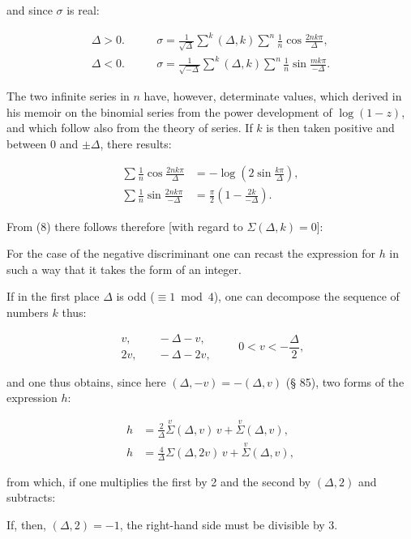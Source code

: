 and since $\sigma$ is real:

\[
\begin{aligned}
\Delta>0. &\qquad \sigma = \frac{1}{\sqrt{\Delta}}\overset{k}{\sum}(\Delta,k)\overset{n}{\sum}\frac{1}{n}\cos\frac{2nk\pi}{\Delta},\\
\Delta<0. &\qquad \sigma = \frac{1}{\sqrt{-\Delta}}\overset{k}{\sum}(\Delta,k)\overset{n}{\sum}\frac{1}{n}\sin\frac{mk\pi}{-\Delta}. %
\end{aligned}
\]

The two infinite series in $n$ have, however, determinate
values, which  derived in his memoir on the binomial series
from the power development of $\log(1-z)$, and which follow
also from the theory of  series. If $k$ is
then taken positive and between $0$ and $\pm\Delta$, there results:

\[
\begin{aligned}
\sum\frac{1}{n}\cos\frac{2nk\pi}{\Delta} &= -\log\left(2\sin\frac{k\pi}{\Delta}\right),\\
\sum\frac{1}{n}\sin\frac{2nk\pi}{-\Delta} &= \frac{\pi}{2}\left(1 - \frac{2k}{-\Delta}\right).
\end{aligned}
\]

From (8) there follows therefore [with regard to $\Sigma(\Delta,k) = 0$]:


For the case of the negative discriminant one can recast the
expression for $h$ in such a way that it takes the form of an
integer.

If in the first place $\Delta$ is odd ($\equiv 1 \bmod 4$), one can
decompose the sequence of numbers $k$ thus:

\[
\begin{aligned}
v, &\quad -\Delta - v,\\
2v, &\quad -\Delta - 2v,
\end{aligned}
\qquad 0 < v < -\frac{\Delta}{2},
\]

and one thus obtains, since here $(\Delta,-v) = -(\Delta,v)$ (§ 85), two
forms of the expression $h$:

\[
\begin{aligned}
h &= \frac{2}{\Delta}\overset{v}{\Sigma}(\Delta,v)\,v + \overset{v}{\Sigma}(\Delta,v),\\
h &= \frac{4}{\Delta}\Sigma(\Delta,2v)\,v + \overset{v}{\Sigma}(\Delta,v),
\end{aligned}
\]

from which, if one multiplies the first by 2 and the second by $(\Delta,2)$
and subtracts:


If, then, $(\Delta,2) = -1$, the right-hand side must be
divisible by 3.
